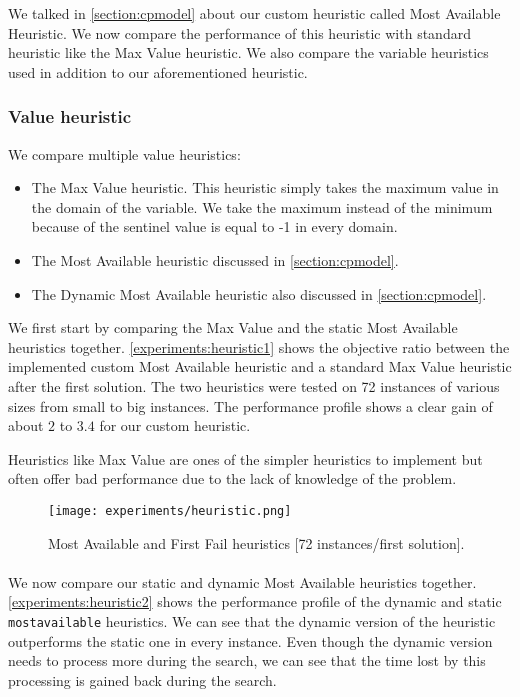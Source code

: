\documentclass[../../thesis.tex]{subfiles}
\begin{document}
We talked in \autoref{section:cpmodel} about our custom heuristic called Most Available Heuristic.
We now compare the performance of this heuristic with standard heuristic like the Max Value heuristic.
We also compare the variable heuristics used in addition to our aforementioned heuristic.

\subsubsection{Value heuristic}

We compare multiple value heuristics:

\begin{itemize}
  \item The Max Value heuristic. This heuristic simply takes the maximum value in the domain of the variable. We 
  take the maximum instead of the minimum because of the sentinel value is equal to -1 in every domain. 
  \item The Most Available heuristic discussed in \autoref{section:cpmodel}.
  \item The Dynamic Most Available heuristic also discussed in \autoref{section:cpmodel}.
\end{itemize}

We first start by comparing the Max Value and the static Most Available heuristics together.
\autoref{experiments:heuristic1} shows the objective ratio between the implemented custom Most Available heuristic and a standard 
Max Value heuristic after the first solution.
The two heuristics were tested on 72 instances of various sizes from small to big instances.
The performance profile shows a clear gain of about $2$ to $3.4$ for our custom heuristic.

Heuristics like Max Value are ones of the simpler heuristics to implement but often offer bad performance due to 
the lack of knowledge of the problem.


\begin{figure}
  \centering
  \texttt{[image: experiments/heuristic.png]}
  \caption{Most Available and First Fail heuristics [72 instances/first solution].}
  \label{experiments:heuristic1}
\end{figure}

\paragraph{}

We now compare our static and dynamic Most Available heuristics together.
\autoref{experiments:heuristic2} shows the performance profile of the dynamic and static \texttt{mostavailable} heuristics.
We can see that the dynamic version of the heuristic outperforms the static one in every instance.
Even though the dynamic version needs to process more during the search, we can see that the time lost 
by this processing is gained back during the search.
\end{document}
